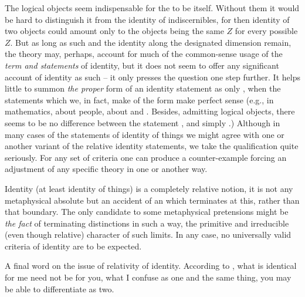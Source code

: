  The logical objects seem indispensable
for the  to be itself. Without them it would be
hard to distinguish it from the identity of indiscernibles, for then identity of
two objects could amount only to the objects being the same $Z$ for every possible
$Z$.  But as long as such  and the
identity along the designated dimension remain, the theory may, perhaps, account
for much of the common-sense usage of the {\em term and statements} of identity,
but it does not seem to offer any significant account of identity as such -- it
only presses the question one step further.  It helps little to summon {\em the
  proper} form of an identity statement as only , when the statements which we, in fact, make of the form  make perfect sense (e.g., in mathematics, about people, about
 and .  Besides, admitting logical objects,
there seems to be no difference between the statement ,  and simply
.)  Although in many cases of the statements of
identity of things we might agree with one or another variant of the
relative identity statements, we take the qualification 
quite seriously. For any set of criteria one can produce a counter-example
forcing an adjustment of any specific theory in one or another way.

Identity (at least identity of  things) is a completely relative
notion, it is not any metaphysical absolute but an accident of an 
which
terminates  at this, rather than that boundary. %
The only candidate to some metaphysical pretensions might be {\em the fact} of
terminating distinctions in such a way, the primitive and irreducible (even
though relative) character of such limits.  In any case, no 
universally valid criteria of identity are to be expected.

\pa A final word on the issue of relativity of identity. According to
, what is identical for me need not be for you, 
what I confuse as one and the same thing, you may be able to differentiate as
two.


